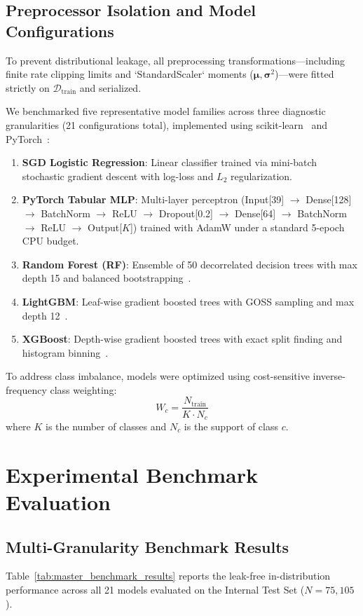 \documentclass[conference,10pt,twocolumn]{IEEEtran}
\begin{document}
\subsection{Preprocessor Isolation and Model Configurations}
To prevent distributional leakage, all preprocessing transformations---including finite rate clipping limits and `StandardScaler` moments ($\boldsymbol{\mu}, \boldsymbol{\sigma}^2$)---were fitted strictly on $\mathcal{D}_{\text{train}}$ and serialized. 

We benchmarked five representative model families across three diagnostic granularities (21 configurations total), implemented using scikit-learn~\cite{pedregosa2011scikit} and PyTorch~\cite{paszke2019pytorch}:
\begin{enumerate}
    \item \textbf{SGD Logistic Regression}: Linear classifier trained via mini-batch stochastic gradient descent with log-loss and $L_2$ regularization.
    \item \textbf{PyTorch Tabular MLP}: Multi-layer perceptron (Input[39] $\to$ Dense[128] $\to$ BatchNorm $\to$ ReLU $\to$ Dropout[0.2] $\to$ Dense[64] $\to$ BatchNorm $\to$ ReLU $\to$ Output[$K$]) trained with AdamW under a standard 5-epoch CPU budget.
    \item \textbf{Random Forest (RF)}: Ensemble of 50 decorrelated decision trees with max depth 15 and balanced bootstrapping~\cite{breiman2001random}.
    \item \textbf{LightGBM}: Leaf-wise gradient boosted trees with GOSS sampling and max depth 12~\cite{ke2017lightgbm}.
    \item \textbf{XGBoost}: Depth-wise gradient boosted trees with exact split finding and histogram binning~\cite{chen2016xgboost}.
\end{enumerate}

To address class imbalance, models were optimized using cost-sensitive inverse-frequency class weighting:
\begin{equation}
W_c = \frac{N_{\text{train}}}{K \cdot N_c}
\end{equation}
where $K$ is the number of classes and $N_c$ is the support of class $c$.

\section{Experimental Benchmark Evaluation}
\label{sec:benchmark}

\subsection{Multi-Granularity Benchmark Results}
Table~\ref{tab:master_benchmark_results} reports the leak-free in-distribution performance across all 21 models evaluated on the Internal Test Set ($N = 75,105$).
\end{document}
